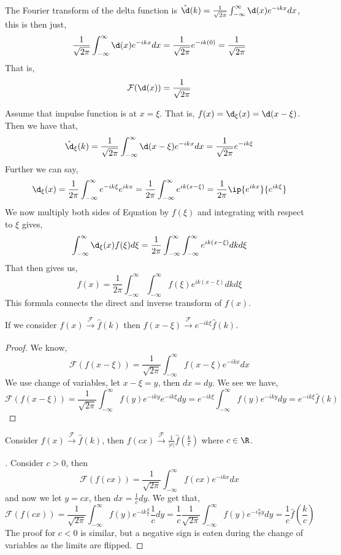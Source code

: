 \noindent
The Fourier transform of the delta function is $\hat \d (k) = \frac{1}{\sqrt{2\pi}}\int_{-\infty}^\infty \d(x) e^{-ikx}dx$, this is then just,
$$ \frac{1}{\sqrt{2\pi}}\int_{-\infty}^\infty \d(x) e^{-ikx}dx = \frac{1}{\sqrt{2\pi}}e^{-ik (0)} = \frac{1}{\sqrt{2\pi}} $$
That is,
$$ \mathcal{F}(\d (x)) = \frac{1}{\sqrt{2\pi}} $$

\noindent
Assume that impulse function is at $x = \xi$. That is, $f(x) = \d_\xi (x) = \d (x - \xi)$. Then we have that,
$$ \hat \d_\xi(k) = \frac{1}{\sqrt{2\pi}}\int_{-\infty}^\infty \d(x - \xi)e^{-ikx}dx = \frac{1}{\sqrt{2\pi}}e^{-ik\xi} $$
Further we can say,
\begin{equation}
  \d_\xi (x) = \frac{1}{2\pi}\int_{-\infty}^\infty e^{-ik\xi}e^{ikx} = \frac{1}{2\pi}\int_{-\infty}^\infty e^{ik(x - \xi)} = \frac{1}{2\pi}\ip{e^{ikx}}{e^{ik\xi}}\label{equ:del}
\end{equation}
We now multiply both sides of Equation  by $f(\xi)$ and integrating with respect to $\xi$ gives,
$$ \int_{-\infty}^\infty \d_\xi (x)f(\xi) d\xi = \frac{1}{2\pi}\int_{-\infty}^\infty \int_{-\infty}^\infty e^{ik(x - \xi)}dkd\xi $$
That then gives us,
$$ f(x) = \frac{1}{2\pi}\int_{-\infty}^\infty \int_{-\infty}^\infty f(\xi)e^{ik(x - \xi)}dkd\xi $$
This formula connects the direct and inverse transform of $f(x)$.

\begin{nthm}[]
  If we consider $f(x) \xrightarrow[]{\mathcal{F}} \hat f(k)$ then $f(x - \xi) \xrightarrow[]{\mathcal{F}} e^{-ik\xi} \hat f(k)$.
\end{nthm}
\begin{proof}
  We know,
  $$ \mathcal{F}(f(x - \xi)) = \frac{1}{\sqrt{2\pi}}\int_{-\infty}^\infty f(x - \xi)e^{-ikx}dx $$
  We use change of variables, let $x - \xi = y$, then $dx = dy$. We see we have,
  $$ \mathcal{F}(f(x - \xi)) = \frac{1}{\sqrt{2\pi}}\int_{-\infty}^\infty f(y)e^{-iky}e^{-ik\xi}dy = e^{-ik\xi}\int_{-\infty}^\infty f(y)e^{-iky}dy = e^{-ik\xi}\hat f(k)$$
\end{proof}

\begin{nthm}[]
  Consider $f(x) \xrightarrow[]{\mathcal{F}} \hat f(k)$, then $f(cx) \xrightarrow[]{\mathcal{F}} \frac{1}{|c|}\hat f\left(\frac{k}{c}\right)$ where $c \in \R$.
\end{nthm}
\begin{proof}[]
  Consider $c > 0$, then
  $$ \mathcal{F}(f(cx)) = \frac{1}{\sqrt{2\pi}}\int_{-\infty}^\infty f(cx)e^{-ikx}dx $$
  and now we let $y = cx$, then $dx = \frac{1}{c}dy$. We get that,
  $$ \mathcal{F}(f(cx)) = \frac{1}{\sqrt{2\pi}}\int_{-\infty}^\infty f(y)e^{-ik \frac{y}{c}}\frac{1}{c}dy = \frac{1}{c} \frac{1}{\sqrt{2\pi}}\int_{-\infty}^\infty f(y)e^{-i \frac{k}{c} y}dy = \frac{1}{c} \hat f\left( \frac{k}{c} \right) $$
  The proof for $c < 0$ is similar, but a negative sign is eaten during the change of variables as the limits are flipped.
\end{proof}


